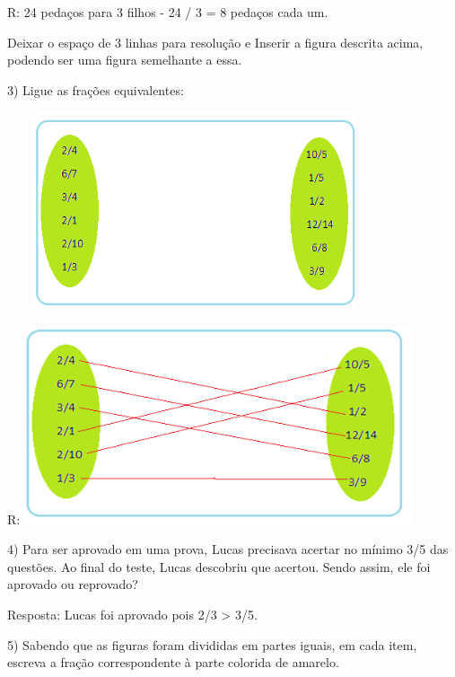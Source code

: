 R: 24 pedaços para 3 filhos - 24 / 3 = 8 pedaços cada um.

Deixar o espaço de 3 linhas para resolução e Inserir a figura descrita
acima, podendo ser uma figura semelhante a essa.

3) Ligue as frações equivalentes:

\includegraphics[width=4.35393in,height=2.301in]{./imgSAEB_6_MAT/media/image30.png}

R:
\includegraphics[width=4.5116in,height=2.28926in]{./imgSAEB_6_MAT/media/image31.png}

4) Para ser aprovado em uma prova, Lucas precisava acertar no mínimo 3/5
das questões. Ao final do teste, Lucas descobriu que acertou. Sendo
assim, ele foi aprovado ou reprovado?

Resposta: Lucas foi aprovado pois 2/3 \textgreater{} 3/5.

5) Sabendo que as figuras foram divididas em partes iguais, em cada
item, escreva a fração correspondente à parte colorida de amarelo.


